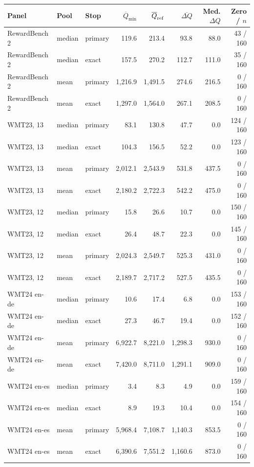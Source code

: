 \begin{table}[t]
\centering\small
\begin{tabular}{lllrrrrr}
\toprule
Panel & Pool & Stop & $\overline{Q}_{\min}$ & $\overline{Q}_{\rm ref}$ & $\overline{\Delta Q}$ & Med. $\Delta Q$ & Zero / $n$ \\
\midrule
RewardBench 2 & median & primary & 119.6 & 213.4 & 93.8 & 88.0 & 43 / 160 \\
RewardBench 2 & median & exact & 157.5 & 270.2 & 112.7 & 111.0 & 35 / 160 \\
RewardBench 2 & mean & primary & 1,216.9 & 1,491.5 & 274.6 & 216.5 & 0 / 160 \\
RewardBench 2 & mean & exact & 1,297.0 & 1,564.0 & 267.1 & 208.5 & 0 / 160 \\
WMT23, 13 & median & primary & 83.1 & 130.8 & 47.7 & 0.0 & 124 / 160 \\
WMT23, 13 & median & exact & 104.3 & 156.5 & 52.2 & 0.0 & 123 / 160 \\
WMT23, 13 & mean & primary & 2,012.1 & 2,543.9 & 531.8 & 437.5 & 0 / 160 \\
WMT23, 13 & mean & exact & 2,180.2 & 2,722.3 & 542.2 & 475.0 & 0 / 160 \\
WMT23, 12 & median & primary & 15.8 & 26.6 & 10.7 & 0.0 & 150 / 160 \\
WMT23, 12 & median & exact & 26.4 & 48.7 & 22.3 & 0.0 & 145 / 160 \\
WMT23, 12 & mean & primary & 2,024.3 & 2,549.7 & 525.3 & 431.0 & 0 / 160 \\
WMT23, 12 & mean & exact & 2,189.7 & 2,717.2 & 527.5 & 435.5 & 0 / 160 \\
WMT24 en-de & median & primary & 10.6 & 17.4 & 6.8 & 0.0 & 153 / 160 \\
WMT24 en-de & median & exact & 27.3 & 46.7 & 19.4 & 0.0 & 152 / 160 \\
WMT24 en-de & mean & primary & 6,922.7 & 8,221.0 & 1,298.3 & 930.0 & 0 / 160 \\
WMT24 en-de & mean & exact & 7,420.0 & 8,711.0 & 1,291.1 & 909.0 & 0 / 160 \\
WMT24 en-es & median & primary & 3.4 & 8.3 & 4.9 & 0.0 & 159 / 160 \\
WMT24 en-es & median & exact & 8.9 & 19.3 & 10.4 & 0.0 & 154 / 160 \\
WMT24 en-es & mean & primary & 5,968.4 & 7,108.7 & 1,140.3 & 853.5 & 0 / 160 \\
WMT24 en-es & mean & exact & 6,390.6 & 7,551.2 & 1,160.6 & 873.0 & 0 / 160 \\

\end{tabular}
\end{table}
